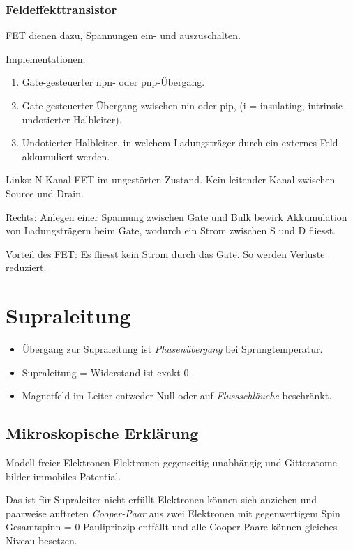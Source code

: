 \documentclass[10pt,a4paper]{scrartcl}
\begin{document}
\begin{multicols*}{3}
	\subsubsection*{Feldeffekttransistor}
	
	FET dienen dazu, Spannungen ein- und auszuschalten.
	
	Implementationen:
	
	\begin{enumerate}
	\compaq
	\item
	Gate-gesteuerter npn- oder pnp-Übergang.
	\item
	Gate-gesteuerter Übergang zwischen nin oder pip, (i = insulating, intrinsic \dahe undotierter Halbleiter).
	\item
	Undotierter Halbleiter, in welchem Ladungsträger durch ein externes Feld akkumuliert werden.
	\end{enumerate}
	
	
	Links: N-Kanal FET im ungestörten Zustand. Kein leitender Kanal zwischen Source und Drain.
	
	Rechts: Anlegen einer Spannung zwischen Gate und Bulk bewirk Akkumulation von Ladungsträgern beim Gate, wodurch ein Strom zwischen S und D fliesst.
	
	Vorteil des FET: Es fliesst kein Strom durch das Gate. So werden Verluste reduziert.
	
	\section{Supraleitung}
	
	\begin{itemize}
	\compaq
	\item
	Übergang zur Supraleitung ist \emph{Phasenübergang} bei Sprungtemperatur.
	\item
	Supraleitung = Widerstand ist exakt 0.
	\item
	Magnetfeld im Leiter entweder Null oder auf \emph{Flussschläuche} beschränkt.
	\end{itemize}
	
	\subsection{Mikroskopische Erklärung}
	
	Modell freier Elektronen \dahe Elektronen gegenseitig unabhängig und Gitteratome bilder immobiles Potential.
	
	Das ist für Supraleiter nicht erfüllt \dahe Elektronen können sich anziehen und paarweise auftreten \dahe \emph{Cooper-Paar} aus zwei Elektronen mit gegenwertigem Spin \dahe Gesamtspinn = 0 \dahe Pauliprinzip entfällt und alle Cooper-Paare können gleiches Niveau besetzen.
	

\end{multicols*}
\end{document}
